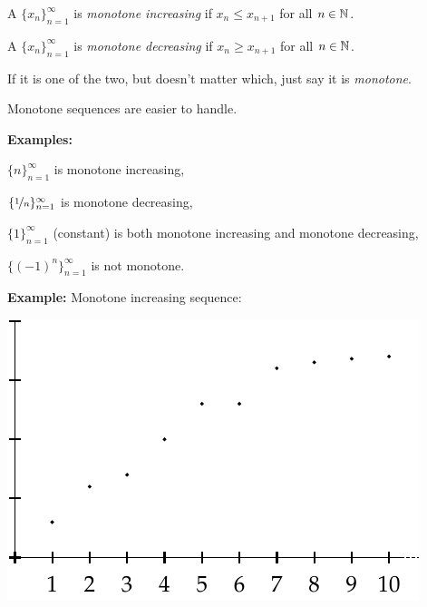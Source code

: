\documentclass[10pt,aspectratio=149]{beamer}
\begin{document}
\begin{frame}
\begin{definition}
A $\{ x_n \}_{n=1}^\infty$ is \emph{monotone increasing} if $x_n \leq x_{n+1}$ for all $n \in {\mathbb{N}}$.  

\pause
A $\{ x_n \}_{n=1}^\infty$ is \emph{monotone decreasing} if $x_n \geq x_{n+1}$ for all $n \in {\mathbb{N}}$.  

\pause
If it is one of the two, but doesn't matter which, just say it is \emph{monotone}.
\end{definition}

\pause

Monotone sequences are easier to handle.

\medskip
\pause

\textbf{Examples:}

\pause
$\{ n \}_{n=1}^\infty$ is monotone increasing,

\pause
$\{ \nicefrac{1}{n} \}_{n=1}^\infty$ is monotone decreasing,

\pause
$\{ 1 \}_{n=1}^\infty$ (constant) is both monotone increasing and monotone decreasing,

\pause
$\{ {(-1)}^n \}_{n=1}^\infty$ is not monotone.

\end{frame}

\begin{frame}
\textbf{Example:} Monotone increasing sequence:

\begin{center}
\includegraphics{../figures/sequence-increasing}
\end{center}

\end{frame}
\end{document}
